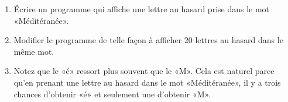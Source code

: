 
\begin{exercice}\label{exoPremiere-0049}

    \begin{enumerate}
        \item
            Écrire un programme qui affiche une lettre au hasard prise dans le mot «Méditéranée».
        \item
            Modifier le programme de telle façon à afficher 20 lettres au hasard dans le même mot.
        \item
            Notez que le «é» ressort plus souvent que le «M». Cela est naturel parce qu'en prenant une lettre au hasard dans le mot «Méditéranée», il y a trois chances d'obtenir «é» et seulement une d'obtenir «M».
    \end{enumerate}

\end{exercice}
